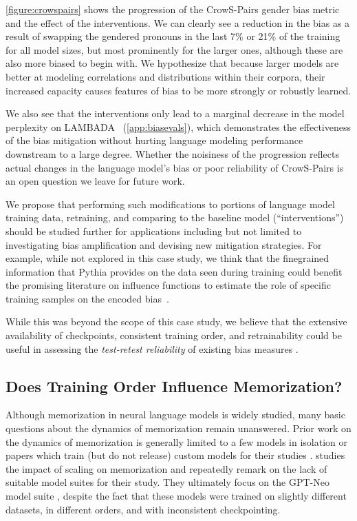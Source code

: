 \ref{figure:crowspairs} shows the progression of the CrowS-Pairs gender bias metric and the effect of the interventions. We can clearly see a reduction in the bias as a result of swapping the gendered pronouns in the last 7\% or 21\% of the training for all model sizes, but most prominently for the larger ones, although these are also more biased to begin with. We hypothesize that because larger models are better at modeling correlations and distributions within their corpora, their increased capacity causes features of bias to be more strongly or robustly learned.

We also see that the interventions only lead to a marginal decrease in the model perplexity on LAMBADA~\citep{paperno2016lambada} (\ref{app:biasevals}), which demonstrates the effectiveness of the bias mitigation without hurting language modeling performance downstream to a large degree. Whether the noisiness of the progression reflects actual changes in the language model's bias or poor reliability of CrowS-Pairs is an open question we leave for future work.

We propose that performing such modifications to portions of language model training data, retraining, and comparing to the baseline model (``interventions'') should be studied further for applications including but not limited to investigating bias amplification and devising new mitigation strategies. For example, while not explored in this case study, we think that the finegrained information that Pythia provides on the data seen during training could benefit the promising literature on influence functions to estimate the role of specific training samples on the encoded bias~\citep{brunet2019understanding,silva2022cross}.

While this was beyond the scope of this case study, we believe that the extensive availability of checkpoints, consistent training order, and retrainability could be useful in assessing the \textit{test-retest reliability} of existing bias measures \citep{van2022undesirable}.

\subsection{Does Training Order Influence Memorization?}

Although memorization in neural language models is widely studied, many basic questions about the dynamics of memorization remain unanswered. Prior work on the dynamics of memorization is generally limited to a few models in isolation \citep{jagielski2022measuring,elazar2022measuring} or papers which train (but do not release) custom models for their studies \citep{tirumala2022memorization,hernandez2022scaling}. \citet{carlini2022quantifying} studies the impact of scaling on memorization and repeatedly remark on the lack of suitable model suites for their study. They ultimately focus on the GPT-Neo model suite \citep{black2021gpt,gpt-j,black2022gpt}, despite the fact that these models were trained on slightly different datasets, in different orders, and with inconsistent checkpointing. 

